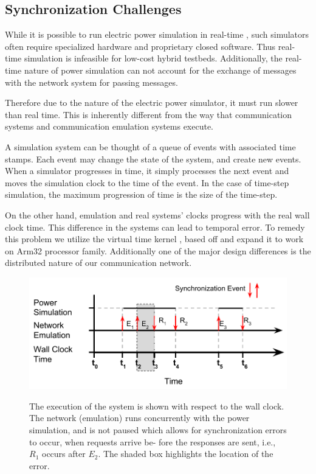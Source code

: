 \subsection{Synchronization Challenges}
While it is possible to run electric power simulation in real-time \cite{rt-sim}, such simulators often require specialized hardware and proprietary closed software. Thus real-time simulation is infeasible for low-cost hybrid testbeds. Additionally, the real-time nature of power simulation can not account for the exchange of messages with the network system for passing messages.

Therefore due to the nature of the electric power simulator, it must run slower than real time.
This is inherently different from the way that communication systems and communication emulation systems execute.

A simulation system can be thought of a queue of events with associated time stamps.
Each event may change the state of the system, and create new events.
When a simulator progresses in time, it simply processes the next event and moves the simulation clock to the time of the event. In the case of time-step simulation, the maximum progression of time is the size of the time-step.

On the other hand, emulation and real systems' clocks progress with the real wall clock time. This difference in the systems can lead to temporal error. To remedy this problem we utilize the virtual time kernel \cite{Yan:VTS:pads15},\cite{Yan:VTM:sosr15} based off \cite{Lamps:TK:pads14} and expand it to work on Arm32 processor family. Additionally one of the major design differences is the distributed nature of our communication network.



\begin{figure}
  \centering
  \includegraphics[scale=0.5]{no-pause-error.pdf}
  \label{sim-err}

  \caption{
    The execution of the system is shown with respect
    to the wall clock. The network (emulation) runs concurrently
    with the power simulation, and is not paused which allows
    for synchronization errors to occur, when requests arrive be-
    fore the responses are sent, i.e., $R_1$ occurs after $E_2$. The
  shaded box highlights the location of the error.}
\end{figure}

